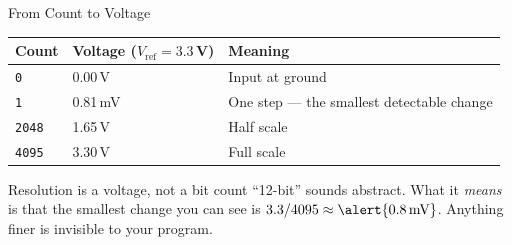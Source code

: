 \documentclass[9pt,aspectratio=169,xcolor=table]{beamer}
\begin{document}
\begin{frame}{From Count to Voltage}
    \begin{center}
    \end{center}

    \vspace{3mm}
    \begin{center}
    {\small
    \striped
    \begin{tabular}{@{}l l l@{}}
        \toprule
        \textbf{Count} & \textbf{Voltage} ($V_{\text{ref}} = 3.3$\,V) & \textbf{Meaning} \\
        \midrule
        \texttt{0}    & 0.00\,V  & Input at ground \\
        \texttt{1}    & 0.81\,mV & \alert{One step} --- the smallest detectable change \\
        \texttt{2048} & 1.65\,V  & Half scale \\
        \texttt{4095} & 3.30\,V  & Full scale \\
        \bottomrule
    \end{tabular}}
    \end{center}

    \vspace{3mm}
    \begin{block}{Resolution is a voltage, not a bit count}
        ``12-bit'' sounds abstract. What it \emph{means} is that the smallest
        change you can see is $3.3 / 4095 \approx \alert{0.8\,\text{mV}}$.
        Anything finer is invisible to your program.
    \end{block}
\end{frame}
\end{document}

